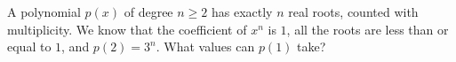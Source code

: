 A polynomial $p(x)$ of degree $n\ge 2$ has exactly $n$ real roots, counted with multiplicity. We know that the coefficient of $x^n$ is $1$,  all the roots are less than or equal to $1$,  and $p(2)=3^n$. What values can $p(1)$ take?